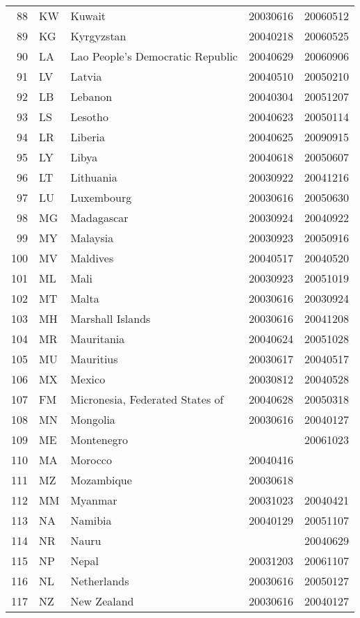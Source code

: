 \begin{longtable}{rllrr}
  88 & KW & Kuwait & 20030616 & 20060512 \\ 
  89 & KG & Kyrgyzstan & 20040218 & 20060525 \\ 
  90 & LA & Lao People's Democratic Republic & 20040629 & 20060906 \\ 
  91 & LV & Latvia & 20040510 & 20050210 \\ 
  92 & LB & Lebanon & 20040304 & 20051207 \\ 
  93 & LS & Lesotho & 20040623 & 20050114 \\ 
  94 & LR & Liberia & 20040625 & 20090915 \\ 
  95 & LY & Libya & 20040618 & 20050607 \\ 
  96 & LT & Lithuania & 20030922 & 20041216 \\ 
  97 & LU & Luxembourg & 20030616 & 20050630 \\ 
  98 & MG & Madagascar & 20030924 & 20040922 \\ 
  99 & MY & Malaysia & 20030923 & 20050916 \\ 
  100 & MV & Maldives & 20040517 & 20040520 \\ 
  101 & ML & Mali & 20030923 & 20051019 \\ 
  102 & MT & Malta & 20030616 & 20030924 \\ 
  103 & MH & Marshall Islands & 20030616 & 20041208 \\ 
  104 & MR & Mauritania & 20040624 & 20051028 \\ 
  105 & MU & Mauritius & 20030617 & 20040517 \\ 
  106 & MX & Mexico & 20030812 & 20040528 \\ 
  107 & FM & Micronesia, Federated States of & 20040628 & 20050318 \\ 
  108 & MN & Mongolia & 20030616 & 20040127 \\ 
  109 & ME & Montenegro &  & 20061023 \\ 
  110 & MA & Morocco & 20040416 &  \\ 
  111 & MZ & Mozambique & 20030618 &  \\ 
  112 & MM & Myanmar & 20031023 & 20040421 \\ 
  113 & NA & Namibia & 20040129 & 20051107 \\ 
  114 & NR & Nauru &  & 20040629 \\ 
  115 & NP & Nepal & 20031203 & 20061107 \\ 
  116 & NL & Netherlands & 20030616 & 20050127 \\ 
  117 & NZ & New Zealand & 20030616 & 20040127 \\ 

\end{longtable}
